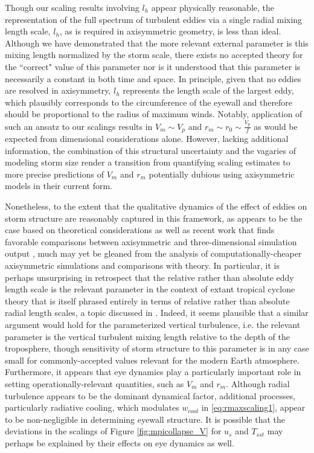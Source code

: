 \documentclass[12pt]{article}
\begin{document}
Though our scaling results involving $l_h$ appear physically reasonable, the representation of the full spectrum of turbulent eddies via a single radial mixing length scale, $l_h$, as is required in axisymmetric geometry, is less than ideal.  Although we have demonstrated that the more relevant external parameter is this mixing length normalized by the storm scale, there exists no accepted theory for the ``correct" value of this parameter nor is it understood that this parameter is necessarily a constant in both time and space. In principle, given that no eddies are resolved in axisymmetry, $l_h$ represents the length scale of the largest eddy, which plausibly corresponds to the circumference of the eyewall and therefore should be proportional to the radius of maximum winds. Notably, application of such an ansatz to our scalings results in $V_m \sim V_p$ and $r_m \sim r_0 \sim \frac{V_p}{f}$ as would be expected from dimensional considerations alone.  However, lacking additional information, the combination of this structural uncertainty and the vagaries of modeling storm size render a transition from quantifying scaling estimates to more precise predictions of $V_m$ and $r_m$ potentially dubious using axisymmetric models in their current form.

Nonetheless, to the extent that the qualitative dynamics of the effect of eddies on storm structure are reasonably captured in this framework, as appears to be the case based on theoretical considerations as well as recent work that finds favorable comparisons between axisymmetric and three-dimensional simulation output \citep{Bryan_2011}, much may yet be gleaned from the analysis of computationally-cheaper axisymmetric simulations and comparisons with theory.  In particular, it is perhaps unsurprising in retrospect that the relative rather than absolute eddy length scale is the relevant parameter in the context of extant tropical cyclone theory that is itself phrased entirely in terms of relative rather than absolute radial length scales, a topic discussed in \cite{Emanuel_1995b}. Indeed, it seems plausible that a similar argument would hold for the parameterized vertical turbulence, i.e. the relevant parameter is the vertical turbulent mixing length relative to the depth of the troposphere, though sensitivity of storm structure to this parameter is in any case small for commonly-accepted values relevant for the modern Earth atmosphere. Furthermore, it appears that eye dynamics play a particularly important role in setting operationally-relevant quantities, such as $V_m$ and $r_m$.  Although radial turbulence appears to be the dominant dynamical factor, additional processes, particularly radiative cooling, which modulates $w_{cool}$ in \eqref{eq:rmaxscaling1}, appear to be non-negligible in determining eyewall structure. It is possible that the deviations in the scalings of Figure \ref{fig:mpicollapse_V} for $u_s$ and $T_{sst}$ may perhaps be explained by their effects on eye dynamics as well.
\end{document}
